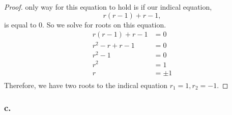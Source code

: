 \documentclass{article}
\theoremstyle{definition}
\begin{document}
\begin{proof}
        only way for this equation to hold is if our indical equation,
        \[
        r(r-1) +r -1,
        \] 
       is equal to 0. So we solve for roots on this equation.
       \begin{align*}
           r(r-1) + r - 1 &= 0 \\
           r^2 - r + r - 1 &= 0 \\
           r^2 - 1 &= 0 \\
           r^2 &= 1 \\
           r &= \pm 1 \\
       \end{align*}
       Therefore, we have two roots to the indical equation $r_1 = 1, r_2 = -1$.
    \end{proof}
    \subsubsection*{c.}
\end{document}
